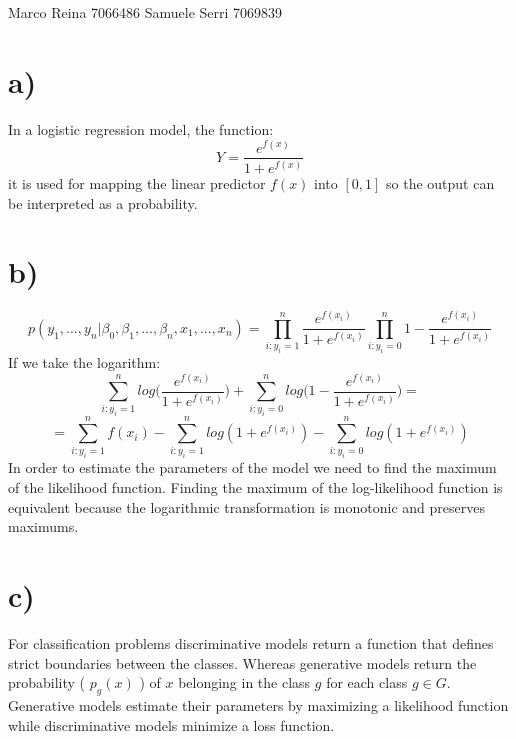 \documentclass[12pt]{article}
\begin{document}
\section*{}
Marco Reina 7066486 \newline
Samuele Serri 7069839 \newline
\section*{a)}
In a logistic regression model, the function:
\begin{equation*}
    Y = \frac{e^{f(x)}}{1 + e^{f(x)}}
\end{equation*}
it is used for mapping the linear predictor $f(x)$ into $[0, 1]$ so the output can be interpreted as a probability.
\section*{b)}
\begin{equation*}
    p(y_1, ..., y_n| \beta_0, \beta_1, ...,\beta_n, x_1, ..., x_n) = \prod_{i : y_i= 1}^n \frac{e^{f(x_i)}}{1 + e^{f(x_i)}}\prod_{i : y_i = 0}^n 1 - \frac{e^{f(x_i)}}{1 + e^{f(x_i)}}
\end{equation*}
If we take the logarithm: \begin{equation*}
    \sum_{i: y_i = 1}^n{log\bigg(\frac{e^{f(x_i)}}{1 + e^{f(x_i)}}\bigg)} + \sum_{i:y_i = 0}^nlog\bigg( 1 - \frac{e^{f(x_i)}}{1 + e^{f(x_i)}}\bigg) = 
\end{equation*}
\begin{equation*}
    =  \sum_{i: y_i = 1}^n f(x_i) -  \sum_{i: y_i = 1}^nlog(1 + e^{f(x_i)}) - \sum_{i:y_i = 0}^nlog(1 + e^{f(x_i)})
\end{equation*}
In order to estimate the parameters of the model we need to find the maximum of the likelihood function. Finding the maximum of the log-likelihood function is equivalent because the logarithmic transformation is monotonic and preserves maximums.
\section*{c)}
For classification problems discriminative models return a function that defines strict boundaries between the classes. Whereas generative models return the probability ( $p_g(x)$ ) of $x$ belonging in the class $g$ for each class $g \in G$. \newline
Generative models estimate their parameters by maximizing a likelihood function while discriminative models minimize a loss function. 
\end{document}

